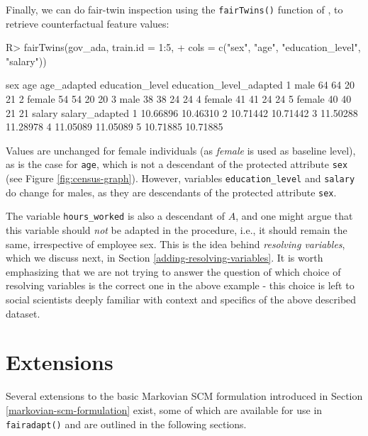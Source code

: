 \documentclass[
  nojss]{jss}
\begin{document}
Finally, we can do fair-twin inspection using the \texttt{fairTwins()}
function of , to retrieve counterfactual feature values:

\begin{CodeChunk}
\begin{CodeInput}
R> fairTwins(gov_ada, train.id = 1:5,
+           cols = c("sex", "age", "education_level", "salary"))
\end{CodeInput}
\begin{CodeOutput}
     sex age age_adapted education_level education_level_adapted
1   male  64          64              20                      21
2 female  54          54              20                      20
3   male  38          38              24                      24
4 female  41          41              24                      24
5 female  40          40              21                      21
    salary salary_adapted
1 10.66896       10.46310
2 10.71442       10.71442
3 11.50288       11.28978
4 11.05089       11.05089
5 10.71885       10.71885
\end{CodeOutput}
\end{CodeChunk}

Values are unchanged for female individuals (as \emph{female} is used as
baseline level), as is the case for \texttt{age}, which is not a
descendant of the protected attribute \texttt{sex} (see Figure
\ref{fig:census-graph}). However, variables \texttt{education\_level}
and \texttt{salary} do change for males, as they are descendants of the
protected attribute \texttt{sex}.

The variable \texttt{hours\_worked} is also a descendant of \(A\), and
one might argue that this variable should \emph{not} be adapted in the
procedure, i.e., it should remain the same, irrespective of employee
sex. This is the idea behind \emph{resolving variables}, which we
discuss next, in Section \ref{adding-resolving-variables}. It is worth
emphasizing that we are not trying to answer the question of which
choice of resolving variables is the correct one in the above example -
this choice is left to social scientists deeply familiar with context
and specifics of the above described dataset.

\hypertarget{extensions}{%
\section{Extensions}\label{extensions}}

Several extensions to the basic Markovian SCM formulation introduced in
Section \ref{markovian-scm-formulation} exist, some of which are
available for use in \texttt{fairadapt()} and are outlined in the
following sections.
\end{document}
